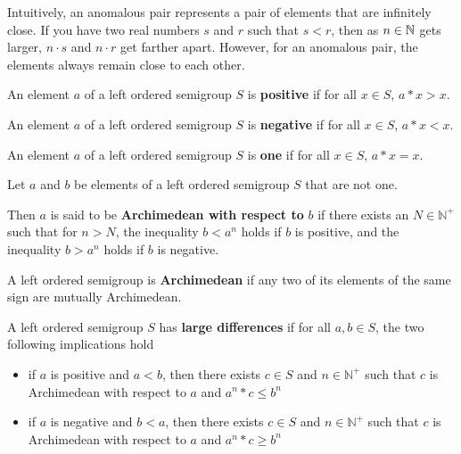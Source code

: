 Intuitively, an anomalous pair represents a pair
of elements that are infinitely close.
If you have two real numbers $s$ and $r$ such that $s < r$,
then as $n \in \mathbb{N}$ gets larger, $n\cdot s$ and $n\cdot r$
get farther apart. However, for an anomalous pair,
the elements always remain close to each other.

\begin{definition}\label{def:positive}\leanok
{}
An element $a$ of a left ordered semigroup $S$ is \textbf{positive} if for all $x\in S$, $a*x > x$.
\end{definition}

\begin{definition}\label{def:negative}\leanok
{}
An element $a$ of a left ordered semigroup $S$
is \textbf{negative} if for all $x\in S$, $a*x < x$.
\end{definition}

\begin{definition}\label{def:one}\leanok
{}
An element $a$ of a left ordered semigroup $S$
is \textbf{one} if for all $x\in S$, $a*x = x$.
\end{definition}

\begin{definition}\label{def:arch_wrt}\leanok
{}
Let $a$ and $b$ be elements of a left ordered semigroup $S$ that are not one.

Then $a$ is said to be \textbf{Archimedean with respect to} $b$
if there exists an $N\in \mathbb{N}^+$ such that for $n > N$,
the inequality $b < a^n$ holds if $b$ is positive,
and the inequality $b > a^n$ holds if $b$ is negative.
\end{definition}

\begin{definition}\label{def:arch}\leanok
{}
A left ordered semigroup is \textbf{Archimedean} if any two of its elements
of the same sign are mutually Archimedean.
\end{definition}

\begin{definition}\label{def:has_large_differences}\leanok
A left ordered semigroup $S$ has \textbf{large differences} if
for all $a,b\in S$, the two following implications hold
\begin{itemize}
\item if $a$ is positive and $a<b$, then there exists $c\in S$
and $n\in \mathbb{N}^+$ such that $c$ is Archimedean with respect to $a$
and $a^n*c \le b^n$
\item if $a$ is negative and $b < a$, then there exists $c\in S$
and $n\in \mathbb{N}^+$ such that $c$ is Archimedean with respect to $a$
and $a^n*c \ge b^n$
\end{itemize}
\end{definition}

